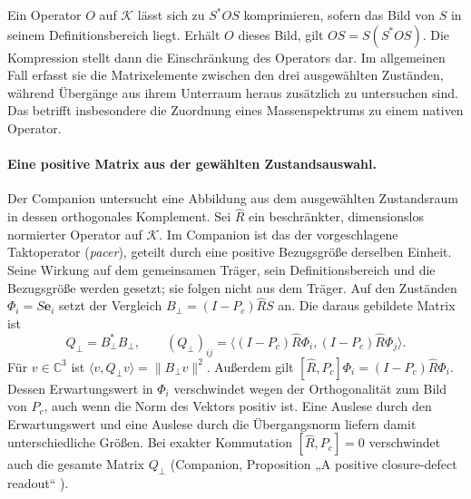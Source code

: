 Ein Operator \(O\) auf \(\mathcal K\) lässt sich zu \(S^*OS\) komprimieren, sofern das Bild von \(S\) in seinem Definitionsbereich liegt. Erhält \(O\) dieses Bild, gilt \(OS=S(S^*OS)\). Die Kompression stellt dann die Einschränkung des Operators dar. Im allgemeinen Fall erfasst sie die Matrixelemente zwischen den drei ausgewählten Zuständen, während Übergänge aus ihrem Unterraum heraus zusätzlich zu untersuchen sind. Das betrifft insbesondere die Zuordnung eines Massenspektrums zu einem nativen Operator.

\paragraph{Eine positive Matrix aus der gewählten Zustandsauswahl.}
Der Companion untersucht eine Abbildung aus dem ausgewählten Zustandsraum in dessen orthogonales Komplement. Sei \(\widehat R\) ein beschränkter, dimensionslos normierter Operator auf \(\mathcal K\). Im Companion ist das der vorgeschlagene Taktoperator (\emph{pacer}), geteilt durch eine positive Bezugsgröße derselben Einheit. Seine Wirkung auf dem gemeinsamen Träger, sein Definitionsbereich und die Bezugsgröße werden gesetzt; sie folgen nicht aus dem Träger. Auf den Zuständen \(\Phi_i=S\mathbf e_i\) setzt der Vergleich \(B_\perp=(I-P_c)\widehat R S\) an. Die daraus gebildete Matrix ist
\begin{equation}
 Q_\perp=B_\perp^*B_\perp,\qquad
 (Q_\perp)_{ij}
 =\big\langle (I-P_c)\widehat R\Phi_i,(I-P_c)\widehat R\Phi_j\big\rangle .
 \label{eq:generation-defect-readout}
\end{equation}
Für \(v\in\mathbb C^3\) ist \(\langle v,Q_\perp v\rangle=\|B_\perp v\|^2\). Außerdem gilt \([\widehat R,P_c]\Phi_i=(I-P_c)\widehat R\Phi_i\). Dessen Erwartungswert in \(\Phi_i\) verschwindet wegen der Orthogonalität zum Bild von \(P_c\), auch wenn die Norm des Vektors positiv ist. Eine Auslese durch den Erwartungswert und eine Auslese durch die Übergangsnorm liefern damit unterschiedliche Größen. Bei exakter Kommutation \([\widehat R,P_c]=0\) verschwindet auch die gesamte Matrix \(Q_\perp\) (Companion, Proposition „A positive closure-defect readout“ \cite{companion,repo}).

